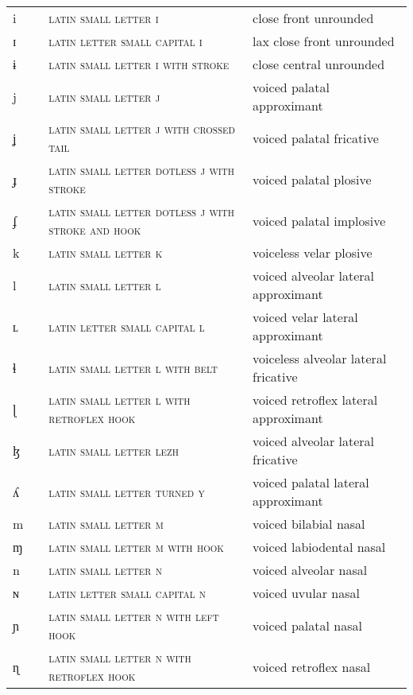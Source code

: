\begin{center}
\begin{xtabular}{ l L{1.1cm} L{5.4cm} L{4.2cm} }
i &  & \textsc{latin small letter i} & close front unrounded \\ 
ɪ &  & \textsc{latin letter small capital i} & lax close front unrounded \\ 
ɨ &  & \textsc{latin small letter i with stroke} & close central unrounded \\ 
j &  & \textsc{latin small letter j} & voiced palatal approximant \\ 
ʝ &  & \textsc{latin small letter j with crossed tail} & voiced palatal fricative \\ 
ɟ &  & \textsc{latin small letter dotless j with stroke} & voiced palatal plosive \\ 
ʄ &  & \textsc{latin small letter dotless j with stroke and hook} & voiced palatal implosive \\ 
k &  & \textsc{latin small letter k} & voiceless velar plosive \\ 
l &  & \textsc{latin small letter l} & voiced alveolar lateral approximant \\ 
ʟ &  & \textsc{latin letter small capital l} & voiced velar lateral approximant \\ 
ɬ &  & \textsc{latin small letter l with belt} & voiceless alveolar lateral fricative \\ 
ɭ &  & \textsc{latin small letter l with retroflex hook} & voiced retroflex lateral approximant \\ 
ɮ &  & \textsc{latin small letter lezh} & voiced alveolar lateral fricative \\ 
ʎ &  & \textsc{latin small letter turned y} & voiced palatal lateral approximant \\ 
m &  & \textsc{latin small letter m} & voiced bilabial nasal \\ 
ɱ &  & \textsc{latin small letter m with hook} & voiced labiodental nasal \\ 
n &  & \textsc{latin small letter n} & voiced alveolar nasal \\ 
ɴ &  & \textsc{latin letter small capital n} & voiced uvular nasal \\ 
ɲ &  & \textsc{latin small letter n with left hook} & voiced palatal nasal \\ 
ɳ &  & \textsc{latin small letter n with retroflex hook} & voiced retroflex nasal \\ 

\end{xtabular}
\end{center}
